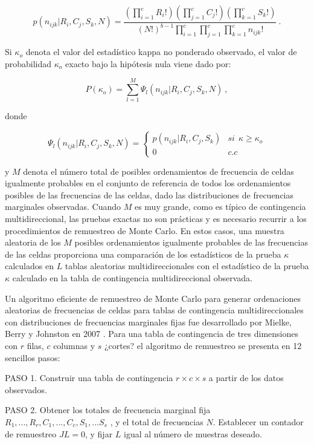 \documentclass[12pt,a4paper,]{book}
\numberwithin{dummy}{section}
\theoremstyle{ocrenumbox}
\theoremstyle{blacknumex}
\theoremstyle{blacknumbox}
\theoremstyle{ocrenum}
\theoremstyle{ocrenum}
\begin{document}
\[
p(n_{ijk} |R_i,C_j, S_k,N)=\frac{(\displaystyle\prod_{i=1}^cR_i!)(\prod_{j=1}^cC_j!)(\prod_{k=1}^cS_k!)}{(N!)^{b-1}\displaystyle\prod_{i=1}^c\prod_{j=1}^c\prod_{k=1}^cn_{ijk}!}~.
\]

Si \(\kappa_o\) denota el valor del estadístico kappa no ponderado
observado, el valor de probabilidad \(\kappa_o\) exacto bajo la
hipótesis nula viene dado por:

\[
P(\kappa_o)=\sum_{l=1}^M\Psi_l(n_{ijk} |R_i,C_j, S_k,N)~,
\]

donde

\[
\Psi_l(n_{ijk} |R_i,C_j, S_k,N)= \begin{cases}p(n_{ijk}|R_i,C_j,S_k) & si ~~ \kappa\ge\kappa_o\\0 & c.c\end{cases}
\]

y \(M\) denota el número total de posibles ordenamientos de frecuencia
de celdas igualmente probables en el conjunto de referencia de todos los
ordenamientos posibles de las frecuencias de las celdas, dado las
distribuciones de frecuencias marginales observadas. Cuando \(M\) es muy
grande, como es típico de contingencia multidireccional, las pruebas
exactas no son prácticas y es necesario recurrir a los procedimientos de
remuestreo de Monte Carlo. En estos casos, una muestra aleatoria de los
\(M\) posibles ordenamientos igualmente probables de las frecuencias de
las celdas proporciona una comparación de los estadísticos de la prueba
\(\kappa\) calculados en \(L\) tablas aleatorias multidireccionales con
el estadístico de la prueba \(\kappa\) calculado en la tabla de
contingencia multidireccional observada.

Un algoritmo eficiente de remuestreo de Monte Carlo para generar
ordenaciones aleatorias de frecuencias de celdas para tablas de
contingencia multidireccionales con distribuciones de frecuencias
marginales fijas fue desarrollado por Mielke, Berry y Johnston en 2007
\citep{Mielke2007}. Para una tabla de contingencia de tres dimensiones
con \(r\) filas, \(c\) columnas y \(s\) ¿cortes? el algoritmo de
remuestreo se presenta en 12 sencillos pasos:

PASO 1. Construir una tabla de contingencia \(r\times c\times s\) a
partir de los datos observados.

PASO 2. Obtener los totales de frecuencia marginal fija
\(R_1, . . . , R_r , C_1, . . . , C_c, S_1, . . . S_s\) , y el total de
frecuencias \(N\). Establecer un contador de remuestreo \(JL = 0\), y
fijar \(L\) igual al número de muestras deseado.
\end{document}

